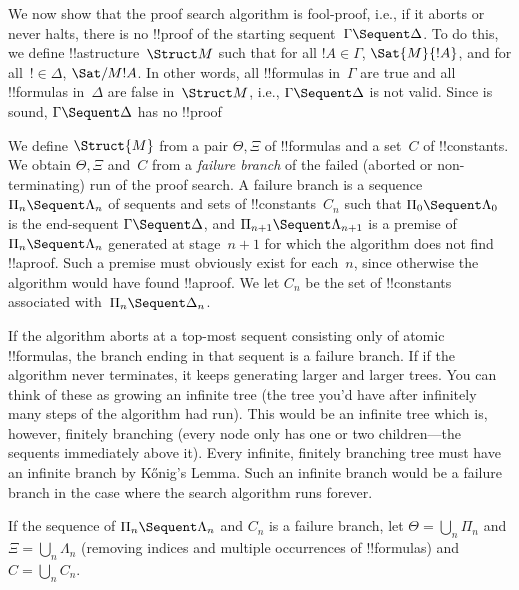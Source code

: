 \documentclass[../../../include/open-logic-section]{subfiles}
\begin{document}


We now show that the proof search algorithm is fool-proof, i.e., if it
aborts or never halts, there is no !!{proof} of the starting
sequent~$\Gamma \Sequent \Delta$. To do this, we define
!!a{structure}~$\Struct M$ such that for all $!A \in \Gamma$,
$\Sat{M}{!A}$, and for all~$! \in \Delta$, $\Sat/{M}{!A}$. In other
words, all !!{formula}s in~$\Gamma$ are true and all !!{formula}s
in~$\Delta$ are false in~$\Struct M$, i.e., $\Gamma \Sequent \Delta$
is not valid. Since  is sound, $\Gamma \Sequent \Delta$ has
no !!{proof}

We define $\Struct{M}$ from a pair $\Theta, \Xi$ of !!{formula}s and a
set~$C$ of !!{constant}s. We obtain $\Theta, \Xi$ and~$C$ from a
\emph{failure branch} of the failed (aborted or non-terminating) run
of the proof search. A failure branch is a sequence $\Pi_n \Sequent
\Lambda_n$ of sequents and sets of !!{constant}s~$C_n$ such that
$\Pi_0 \Sequent \Lambda_0$ is the end-sequent $\Gamma \Sequent
\Delta$, and $\Pi_{n+1} \Sequent \Lambda_{n+1}$ is a premise of $\Pi_n
\Sequent \Lambda_n$ generated at stage~$n+1$ for which the algorithm
does not find !!a{proof}. Such a premise must obviously exist for
each~$n$, since otherwise the algorithm would have found !!a{proof}.
We let $C_n$ be the set of !!{constant}s associated with~$\Pi_n
\Sequent \Delta_n$.

If the algorithm aborts at a top-most sequent consisting only of
atomic !!{formula}s, the branch ending in that sequent is a failure
branch. If if the algorithm never terminates, it keeps generating
larger and larger trees. You can think of these as growing an infinite
tree (the tree you'd have after infinitely many steps of the algorithm
had run). This would be an infinite tree which is, however, finitely
branching (every node only has one or two children---the sequents
immediately above it). Every infinite, finitely branching tree must
have an infinite branch by K\H{o}nig's Lemma. Such an infinite branch
would be a failure branch in the case where the search algorithm runs
forever.

If the sequence of $\Pi_n \Sequent \Lambda_n$ and $C_n$ is a failure
branch, let $\Theta = \bigcup_n \Pi_n$ and $\Xi = \bigcup_n \Lambda_n$
(removing indices and multiple occurrences of !!{formula}s) and $C =
\bigcup_n C_n$.
\end{document}
